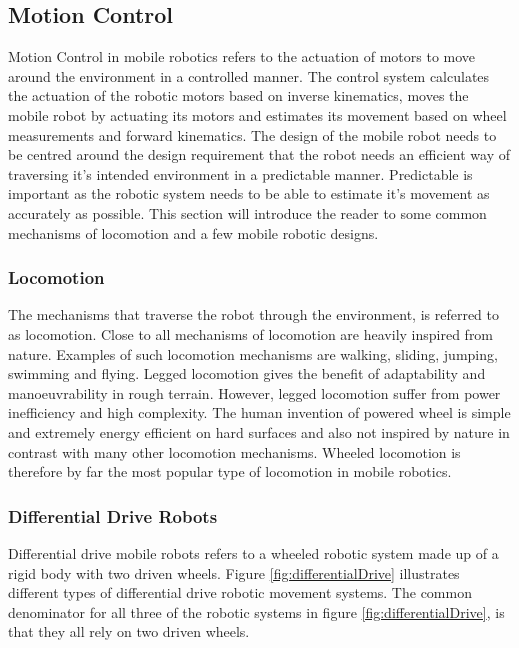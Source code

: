 \subsection{Motion Control}\label{sec:T:AN:MotionControl}
Motion Control in mobile robotics refers to the actuation of motors to move around the environment in a controlled manner. The control system calculates the actuation of the robotic motors based on inverse kinematics, moves the mobile robot by actuating its motors and estimates its movement based on wheel measurements and forward kinematics.
The design of the mobile robot needs to be centred around the design requirement that the robot needs an efficient way of traversing it's intended environment in a predictable manner. Predictable is important as the robotic system needs to be able to estimate it's movement as accurately as possible. This section will introduce the reader to some common mechanisms of locomotion and a few mobile robotic designs.

\subsubsection{Locomotion}
The mechanisms that traverse the robot through the environment, is referred to as locomotion. Close to all mechanisms of locomotion are heavily inspired from nature. Examples of such locomotion mechanisms are walking, sliding, jumping, swimming and flying. Legged locomotion gives the benefit of adaptability and manoeuvrability in rough terrain. However, legged locomotion suffer from power inefficiency and high complexity. The human invention of powered wheel is simple and extremely energy efficient on hard surfaces and also not inspired by nature in contrast with many other locomotion mechanisms. Wheeled locomotion is therefore by far the most popular type of locomotion in mobile robotics\cite{SiegwartRoland2011Itam}. 

\subsubsection{Differential Drive Robots}\label{sec:T:AN:MRD:DifferentialDriveRobots}
Differential drive mobile robots refers to a wheeled robotic system made up of a rigid body with two driven wheels. Figure \ref{fig:differentialDrive} illustrates different types of differential drive robotic movement systems. The common denominator for all three of the robotic systems in figure \ref{fig:differentialDrive}, is that they all rely on two driven wheels.

